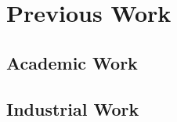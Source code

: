 \chapter{Previous Work} 
\label{Chapter:Previous Work}
\section{Academic Work} 
\label{Section:Academic Work}
\section{Industrial Work} 
\label{Section:Industrial Work}